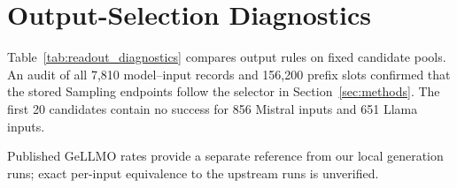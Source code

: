 \section{Output-Selection Diagnostics}
\label{app:readouts}
Table~\ref{tab:readout_diagnostics} compares output rules on fixed candidate pools. An audit of all 7,810 model--input records and 156,200 prefix slots confirmed that the stored Sampling endpoints follow the selector in Section~\ref{sec:methods}. The first 20 candidates contain no success for 856 Mistral inputs and 651 Llama inputs.

Published GeLLMO rates provide a separate reference from our local generation runs; exact per-input equivalence to the upstream runs is unverified.

